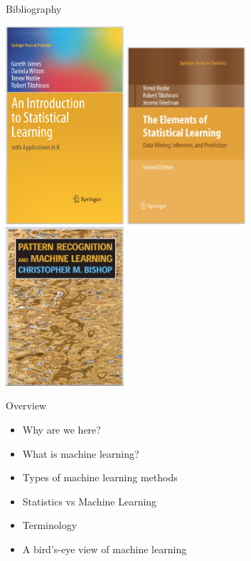 \documentclass[pdf]{beamer}
\newif\ifplacelogo %
\begin{document}
\begin{frame}{Bibliography}
\begin{center}
	\includegraphics[width=0.33\textwidth, height=0.65\textheight]{bookJames.png}
	\includegraphics[width=0.33\textwidth, height=0.65\textheight]{bookHastie.png}
	\includegraphics[width=0.33\textwidth, height=0.65\textheight]{bookBishop.png}
\end{center}
\end{frame}
\placelogofalse %
\begin{frame}{Overview}
\begin{itemize}\addtolength{\itemsep}{0.5\baselineskip}
	\item<2-> Why are we here?
	\item<3-> What is machine learning?
	\item<4-> Types of machine learning methods
	\item<5-> Statistics vs Machine Learning
	\item<6-> Terminology
	\item<7-> A bird's-eye view of machine learning
\end{itemize}
\end{frame}
\end{document}
